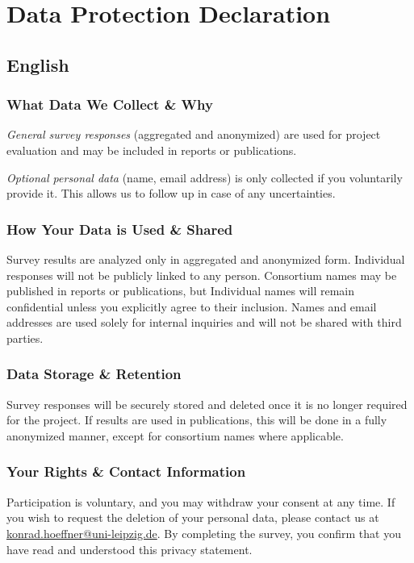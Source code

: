 \documentclass[headsepline,titlepage,twoside,12pt,toc=flat,headings=normal]{scrreprt}
\begin{document}
\section{Data Protection Declaration}\label{english-data-protection-declaration}

\subsection{English}

\subsubsection{What Data We Collect \& Why}
\emph{General survey responses} (aggregated and anonymized) are used for project evaluation and may be included in reports or publications.

\emph{Optional personal data} (name, email address) is only collected if you voluntarily provide it.
This allows us to follow up in case of any uncertainties.

\subsubsection{How Your Data is Used \& Shared}
Survey results are analyzed only in aggregated and anonymized form.
Individual responses will not be publicly linked to any person.
Consortium names may be published in reports or publications, but Individual names will remain confidential unless you explicitly agree to their inclusion.
Names and email addresses are used solely for internal inquiries and will not be shared with third parties.

\subsubsection{Data Storage \& Retention}\label{data-storage-retention}
Survey responses will be securely stored and deleted once it is no longer required for the project.
If results are used in publications, this will be done in a fully anonymized manner, except for consortium names where applicable.

\subsubsection{Your Rights \& Contact Information}\label{your-rights-contact-information}
Participation is voluntary, and you may withdraw your consent at any time.
If you wish to request the deletion of your personal data, please contact us at \href{mailto:konrad.hoeffner@uni-leipzig.de}{konrad.hoeffner@uni-leipzig.de}.
By completing the survey, you confirm that you have read and understood this privacy statement.
\end{document}
